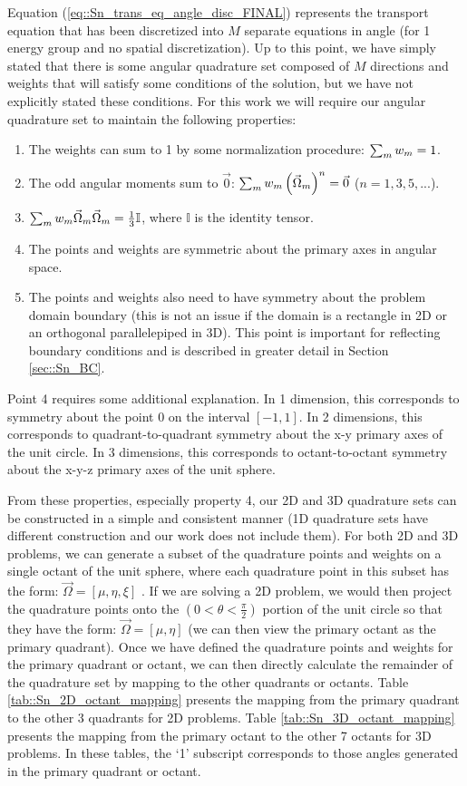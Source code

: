 Equation (\ref{eq::Sn_trans_eq_angle_disc_FINAL}) represents the transport equation that has been discretized into $M$ separate equations in angle (for 1 energy group and no spatial discretization). Up to this point, we have simply stated that there is some angular quadrature set composed of $M$ directions and weights that will satisfy some conditions of the solution, but we have not explicitly stated these conditions. For this work we will require our angular quadrature set to maintain the following properties:

\begin{enumerate}
\item The weights can sum to 1 by some normalization procedure: $\sum\displaylimits_m w_m = 1$.
\item The odd angular moments sum to $\vec{0}$: $\sum\displaylimits_m w_m \left( \vec{\Omega}_m  \right)^n =  \vec{0}$ ($n=1,3,5,...$).
\item $\sum\displaylimits_m w_m  \vec{\Omega}_m \vec{\Omega}_m = \frac{1}{3} \mathbb{I}  $, where $\mathbb{I}$ is the identity tensor.
\item The points and weights are symmetric about the primary axes in angular space. 
\item The points and weights also need to have symmetry about the problem domain boundary (this is not an issue if the domain is a rectangle in 2D or an orthogonal parallelepiped in 3D). This point is important for reflecting boundary conditions and is described in greater detail in Section \ref{sec::Sn_BC}.
\end{enumerate}

\noindent Point 4 requires some additional explanation. In 1 dimension, this corresponds to symmetry about the point 0 on the interval $[-1, 1]$. In 2 dimensions, this corresponds to quadrant-to-quadrant symmetry about the x-y primary axes of the unit circle. In 3 dimensions, this corresponds to octant-to-octant symmetry about the x-y-z primary axes of the unit sphere. 

From these properties, especially property 4, our 2D and 3D quadrature sets can be constructed in a simple and consistent manner (1D quadrature sets have different construction and our work does not include them). For both 2D and 3D problems, we can generate a subset of the quadrature points and weights on a single octant of the unit sphere, where each quadrature point in this subset has the form: $\vec{\Omega} = [\mu, \eta , \xi]$ . If we are solving a 2D problem, we would then project the quadrature points onto the $(0 < \theta < \frac{\pi}{2})$ portion of the unit circle so that they have the form: $\vec{\Omega} = [\mu, \eta ]$ (we can then view the primary octant as the primary quadrant). Once we have defined the quadrature points and weights for the primary quadrant or octant, we can then directly calculate the remainder of the quadrature set by mapping to the other quadrants or octants. Table \ref{tab::Sn_2D_octant_mapping} presents the mapping from the primary quadrant to the other 3 quadrants for 2D problems. Table \ref{tab::Sn_3D_octant_mapping} presents the mapping from the primary octant to the other 7 octants for 3D problems. In these tables, the `1' subscript corresponds to those angles generated in the primary quadrant or octant.

